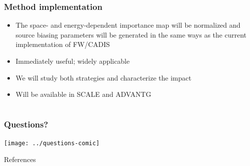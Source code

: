 \documentclass[xcolor=x11names,compress, handout]{beamer}
\renewcommand{\(}{\begin{columns}}
\renewcommand{\)}{\end{columns}}
\newcommand{\<}[1]{\begin{column}{#1}}
\renewcommand{\>}{\end{column}}
\begin{document}
\begin{frame}[fragile]
  \frametitle{Method implementation}

  	\begin{itemize}
    \item The space- and energy-dependent importance map will be normalized and 
     source biasing parameters will be generated in the \alert{same ways} as
     the current implementation of FW/CADIS \vspace*{1 em}
	\item Immediately useful; widely applicable \vspace*{1 em}
	\item We will study both strategies and characterize the impact\vspace*{1 em}
	\item Will be available in SCALE \cite{SCALE} and ADVANTG \cite{Pantelias2013}
	\end{itemize}
	
\end{frame}


\section*{}
\begin{frame}[fragile]
  \frametitle{Questions?}
  \begin{center}
  \texttt{[image: ../questions-comic]}  
  \end{center}
  
\end{frame}

\begin{frame}[allowframebreaks]{References}
	
	
\end{frame}
\end{document}
